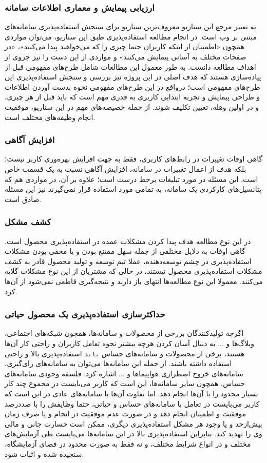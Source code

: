 \subsubsection{ارزیابی پیمایش و معماری اطلاعات سامانه}
به تعبیر مرجع
\cite{albert_measuring_2013}
این سناریو معروف‌ترین سناریو برای سنجش استفاده‌پذیری سامانه‌های مبتنی بر وب است. در انجام مطالعه استفاده‌پذیری طبق این سناریو، می‌توان مواردی همچون «اطمینان از اینکه کاربران حتما چیزی را که می‌خواهند پیدا می‌کنند»، «در صفحات مختلف به آسانی پیمایش می‌کنند» و مواردی از این دست را نیز جزوی از اهداف مطالعه دانست. به طور معمول این مطالعات شامل طرح‌های مفهومی قبل از پیاده‌سازی هستند که هدف اصلی در این پروژه نیز بررسی و سنجش استفاده‌پذیری این طرح‌های مفهومی است؛ درواقع در این طرح‌های مفهومی نحوه بدست آوردن اطلاعات و طراحی پیمایش و تجربه ابتدایی کاربری به قدری مهم است که باید قبل از هر چیزی، و در اولین وهله، تعیین تکلیف شوند.
از جمله خصیصه‌های مهم در این سناریو، موفقیت انجام وظیفه‌های مختلف است.
\subsubsection{افزایش آگاهی}
گاهی اوقات تغییرات در رابط‌های کاربری، فقط به جهت افزایش بهره‌وری کاربر نیست؛ بلکه هدف از اعمال تغییرات در سامانه، افزایش آگاهی نسبت به یک قسمت خاص است. این مسئله در مورد تبلیغات برخط درست است؛ علاوه بر آن، در مواردی هم که پتانسیل‌های کارکردی یک سامانه، به تمامی مورد استفاده قرار نمی‌گیرند نیز این مسئله صادق است.
\subsubsection{کشف مشکل}
در این نوع مطالعه هدف پیدا کردن مشکلات عمده در استفاده‌پذیری محصول است. گاهی اوقات به دلایل مختلفی از جمله سهل ممتنع بودن و یا مخفی بودن مشکلات استفاده‌پذیری در چشم توسعه‌دهنده، عملا تیم توسعه و تولید محصول قادر به کشف مشکلات استفاده‌پذیری محصول نیستند، در حالی که مشتریان از این نوع مشکلات گلایه می‌کنند. معمولا این نوع مطالعه‌ها انتهای باز دارند و نتیجه‌گیری قاطعی نمی‌شود از آن‌ها کرد.
\subsubsection{حداکثرسازی استفاده‌پذیری یک محصول حیاتی}
اگرچه تولیدکنندگان بررخی از محصولات و سامانه‌ها، همچون شبکه‌های اجتماعی، وبلاگ‌ها و ... به دنبال آسان کردن هرچه بیشتر نحوه تعامل کاربران و راحتی کار آن‌ها هستند، برخی از محصولات و سامانه‌های حساس
\texttt{باید}
استفاده‌پذیری بالا و راحتی استفاده داشته باشند. از جمله این سامانه‌ها می‌توان به سامانه‌های رای‌گیری، سامانه‌های خروج اضطراری هواپیماها و ... اشاره کرد. فلسفه وجودی سامانه‌های حساس، همچون سایر سامانه‌ها، این است که کاربر می‌بایست در مجموع چند کار بسیار محدود را با آن‌ها انجام دهد. اما تفاوت آن‌ها با سامانه‌های عادی در این است که کاربر می‌بایست در تعامل با سامانه‌های حساس و حیاتی، حتما وظایفش را با صددرصد موفقیت و اطمینان انجام دهد و در صورت عدم موفقیت در انجام و یا صرف زمان بیش‌از‌حد و یا وجود هر مشکل استفاده‌پذیری دیگری، ممکن است خسارت جانی و مالی وی را تهدید کند. بنابراین استفاده‌پذیری بالا در این سامانه‌ها می‌بایست طی آزمایش‌های مختلف و در انواع شرایط مختلف، و نه فقط به صورت محدود در فضای آزمایشگاه، سنجیده شده و اثبات شود.
